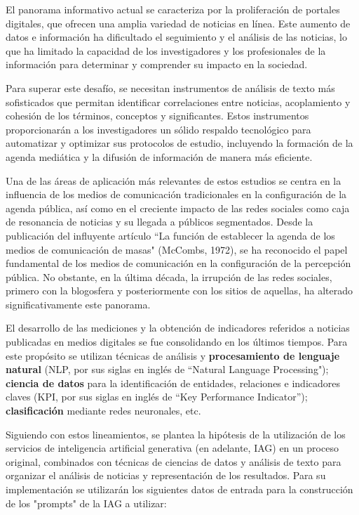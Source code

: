 \documentclass[12pt]{article}
\begin{document}
El panorama informativo actual se caracteriza por la proliferación de portales digitales, que ofrecen una amplia variedad de noticias en línea. Este aumento de datos e información ha dificultado el seguimiento y el análisis de las noticias, lo que ha limitado la capacidad de los investigadores y los profesionales de la información para determinar y comprender su impacto en la sociedad.

Para superar este desafío, se necesitan instrumentos de análisis de texto más sofisticados que permitan identificar correlaciones entre noticias, acoplamiento y cohesión de los términos, conceptos y significantes. Estos instrumentos proporcionarán a los investigadores un sólido respaldo tecnológico para automatizar y optimizar sus protocolos de estudio, incluyendo la formación de la agenda mediática y la difusión de información de manera más eficiente.


Una de las áreas de aplicación más relevantes de estos estudios se centra en la influencia de los medios de comunicación tradicionales en la configuración de la agenda pública, así como en el creciente impacto de las redes sociales como caja de resonancia de noticias y su llegada a públicos segmentados. Desde la publicación del influyente artículo ``La función de establecer la agenda de los medios de comunicación de masas" (McCombs, 1972)\cite{mccombs:1972}, se ha reconocido el papel fundamental de los medios de comunicación en la configuración de la percepción pública. No obstante, en la última década, la irrupción de las redes sociales, primero con la blogosfera y posteriormente con los sitios de aquellas, ha alterado significativamente este panorama.


El desarrollo de las mediciones y la obtención de indicadores referidos a noticias publicadas en medios digitales se fue consolidando en los últimos tiempos. Para este propósito se utilizan técnicas de análisis y \textbf{procesamiento de lenguaje natural} (NLP, por sus siglas en inglés de ``Natural Language Processing"); \textbf{ciencia de datos} para la identificación de entidades, relaciones e indicadores claves (KPI, por sus siglas en inglés de ``Key Performance Indicator''); \textbf{clasificación} mediante redes neuronales, etc. 

Siguiendo con estos lineamientos, se plantea la hipótesis de la utilización de los servicios de inteligencia artificial generativa (en adelante, IAG) en un proceso original, combinados con técnicas de ciencias de datos y análisis de texto para organizar el análisis de noticias y representación de los resultados.
Para su implementación se utilizarán los siguientes datos de entrada para la construcción de los "prompts" de la IAG a utilizar: 
\end{document}
